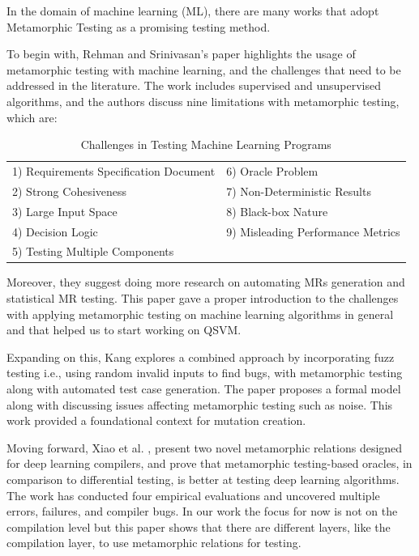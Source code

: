 \documentclass[12pt,a4paper]{article}
\begin{document}
	In the domain of machine learning (ML), there are many works that adopt Metamorphic Testing as a promising testing method. 
	
	To begin with, Rehman and Srinivasan's \cite{frehman2023} paper highlights the usage of metamorphic testing with machine learning, and the challenges that need to be addressed in the literature. The work includes supervised and unsupervised algorithms, and the authors discuss nine limitations with metamorphic testing, which are:
	
	\begin{table}[h!]
		\centering
		\caption{Challenges in Testing Machine Learning Programs}
		\label{tab:my_items_two_col}
		\begin{tabular}{ll}
			\toprule
			1) Requirements Specification Document & 6) Oracle Problem \\
			2) Strong Cohesiveness & 7) Non-Deterministic Results \\
			3) Large Input Space & 8) Black-box Nature \\
			4) Decision Logic & 9) Misleading Performance Metrics \\
			5) Testing Multiple Components & \\
			\bottomrule
		\end{tabular}
	\end{table}
	
	Moreover, they suggest doing more research on automating MRs generation and statistical MR testing. This paper gave a proper introduction to the challenges with applying metamorphic testing on machine learning algorithms in general and that helped us to start working on QSVM. 
	
	Expanding on this, Kang \cite{dkang2022} explores a combined approach by incorporating fuzz testing i.e., using random invalid inputs to find bugs, with metamorphic testing along with automated test case generation. The paper proposes a formal model along with discussing issues affecting metamorphic testing such as noise. This work provided a foundational context for mutation creation.
	
	Moving forward, Xiao et al. \cite{dciao2022}, present two novel metamorphic relations designed for deep learning compilers, and prove that metamorphic testing-based oracles, in comparison to differential testing, is better at testing deep learning algorithms. The work has conducted four empirical evaluations and uncovered multiple errors, failures, and compiler bugs. In our work the focus for now is not on the compilation level but this paper shows that there are different layers, like the compilation layer, to use metamorphic relations for testing.
	
\end{document}
